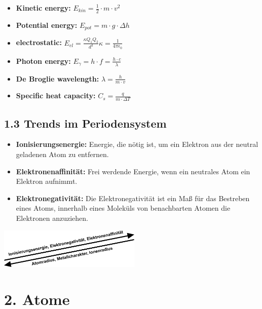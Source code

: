 \begin{multicols*}{4}
{    \begin{itemize}[noitemsep, leftmargin=*]
        \item \textbf{Kinetic energy:} $E_{kin} = \frac{1}{2} \cdot m \cdot v^2$
        \item \textbf{Potential energy:} $E_{pot} = m \cdot g \cdot \Delta h$
        \item \textbf{electrostatic:} $E_{el}=\frac{\kappa Q_1Q_2}{d^3}$\quad $\kappa = \frac{1}{4\pi \epsilon_0}$
        \item \textbf{Photon energy: } $E_\gamma = h\cdot f = \frac{h\cdot c}{\lambda}$
        \item \textbf{De Broglie wavelength: } $\lambda = \frac{h}{m\cdot v}$
        \item \textbf{Specific heat capacity: }$C_s=\frac{q}{m\cdot\Delta T}$
    \end{itemize}
}


\subsection{1.3 Trends im Periodensystem}{
\begin{itemize}[noitemsep, leftmargin=*]
    \item \textbf{Ionisierungsenergie: }Energie, die nötig ist, um ein Elektron aus der neutral geladenen Atom zu entfernen.
    \item \textbf{Elektronenaffinität:} Frei werdende Energie, wenn ein neutrales Atom ein Elektron aufnimmt.
    \item \textbf{Elektronegativität:} Die Elektronegativität ist ein Maß für das Bestreben eines Atoms, innerhalb eines Moleküls von benachbarten Atomen die Elektronen anzuziehen.

    
\end{itemize}\includegraphics[width = 68mm]{Bilder/TrendsimPSE.png}
}

\section{2. Atome}

\end{multicols*}
